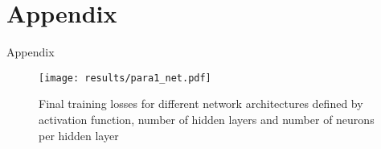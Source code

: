 \chapter{Appendix}\label{appendix}
Appendix
\begin{figure}
    \centering
    \texttt{[image: results/para1\_net.pdf]}
    \caption{Final training losses for different network architectures defined by activation function, number of hidden layers and number of neurons per hidden layer}
    \label{fig:twqetr}
\end{figure}